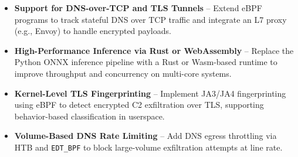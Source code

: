 \documentclass[letterpaper,twocolumn,10pt]{article}
\begin{document}
\begin{itemize}[itemsep=1pt,parsep=0pt]
    \item \textbf{Support for DNS-over-TCP and TLS Tunnels} – Extend eBPF programs to track stateful DNS over TCP traffic and integrate an L7 proxy (e.g., Envoy) to handle encrypted payloads.
    
    \item \textbf{High-Performance Inference via Rust or WebAssembly} – Replace the Python ONNX inference pipeline with a Rust or Wasm-based runtime to improve throughput and concurrency on multi-core systems.
    
    \item \textbf{Kernel-Level TLS Fingerprinting} – Implement JA3/JA4 fingerprinting using eBPF to detect encrypted C2 exfiltration over TLS, supporting behavior-based classification in userspace.
    
    \item \textbf{Volume-Based DNS Rate Limiting} – Add DNS egress throttling via HTB and \texttt{EDT\_BPF} to block large-volume exfiltration attempts at line rate.
\end{itemize}







\end{document}
